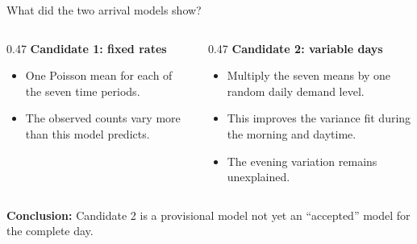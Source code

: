 \documentclass{beamer}
\begin{document}
\begin{frame}{What did the two arrival models show?}
  \small
  \begin{columns}[T,onlytextwidth]
    \begin{column}{0.47\textwidth}
      \textbf{Candidate 1: fixed rates}
      \begin{itemize}
        \item One Poisson mean for each of the seven time periods.
        \item The observed counts vary more than this model predicts.
      \end{itemize}
    \end{column}
    \begin{column}{0.47\textwidth}
      \textbf{Candidate 2: variable days}
      \begin{itemize}
        \item Multiply the seven means by one random daily demand level.
        \item This improves the variance fit during the morning and daytime.
        \item The evening variation remains unexplained.
      \end{itemize}
    \end{column}
  \end{columns}

  \vspace{0.5em}
  \textbf{Conclusion:} Candidate 2 is a provisional model  not yet an ``accepted'' model for the complete day. 
\end{frame}
\end{document}
